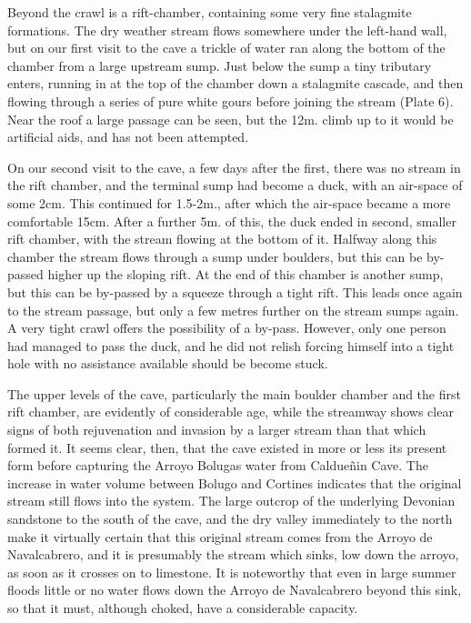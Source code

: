 \documentclass[11pt, a4paper, twoside]{memoir}
\begin{document}
Beyond the crawl is a rift-chamber, containing some very fine stalagmite formations. The dry weather stream flows somewhere under the left-hand wall, but on our first visit to the cave a trickle of water ran along the bottom of the chamber from a large upstream sump. Just below the sump a tiny tributary enters, running in at the top of the chamber down a stalagmite cascade, and then flowing through a series of pure white gours before joining the stream (Plate 6). Near the roof a large passage can be seen, but the 12m. climb up to it would be artificial aids, and has not been attempted.

On our second visit to the cave, a few days after the first, there was no stream in the rift chamber, and the terminal sump had become a duck, with an air-space of some 2cm. This continued for 1.5-2m., after which the air-space became a more comfortable 15cm. After a further 5m. of this, the duck ended in second, smaller rift chamber, with the stream flowing at the bottom of it. Halfway along this chamber the stream flows through a sump under boulders, but this can be by-passed higher up the sloping rift. At the end of this chamber is another sump, but this can be by-passed by a squeeze through a tight rift. This leads once again to the stream passage, but only a few metres further on the stream sumps again. A very tight crawl offers the possibility of a by-pass. However, only one person had managed to pass the duck, and he did not relish forcing himself into a tight hole with no assistance available should be become stuck.

The upper levels of the cave, particularly the main boulder chamber and the first rift chamber, are evidently of considerable age, while the streamway shows clear signs of both rejuvenation and invasion by a larger stream than that which formed it. It seems clear, then, that the cave existed in more or less its present form before capturing the Arroyo Bolugas water from Caldueñin Cave. The increase in water volume between Bolugo and Cortines indicates that the original stream still flows into the system. The large outcrop of the underlying Devonian sandstone to the south of the cave, and the dry valley immediately to the north make it virtually certain that this original stream comes from the Arroyo de Navalcabrero, and it is presumably the stream which sinks, low down the arroyo, as soon as it crosses on to limestone. It is noteworthy that even in large summer floods little or no water flows down the Arroyo de Navalcabrero beyond this sink, so that it must, although choked, have a considerable capacity.
\end{document}
